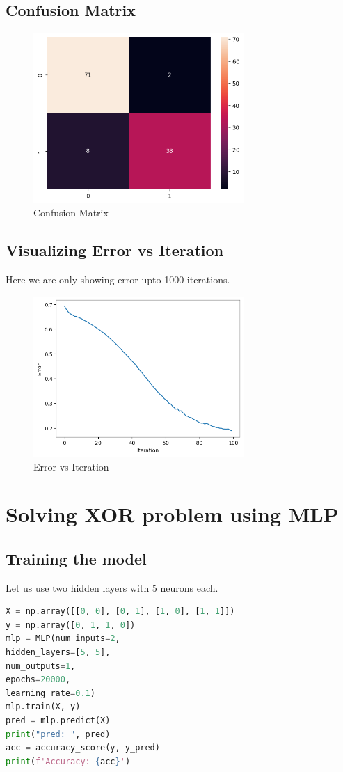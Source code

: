 \subsection{Confusion Matrix}
\begin{figure}[ht]
    \centering
    \includegraphics[width=8cm]{ch/figures/cm4.png}
    \caption{Confusion Matrix}
    \label{fig:loss}
\end{figure}
\newpage
\subsection{Visualizing Error vs Iteration}
Here we are only showing error upto 1000 iterations.
\begin{figure}[ht]
    \centering
    \includegraphics[width=8cm]{ch/figures/loss.png}
    \caption{Error vs Iteration}
    \label{fig:loss}
\end{figure}
\newpage
\section{Solving XOR problem using MLP}
\subsection{Training the model}
Let us use two hidden layers with 5 neurons each.
\begin{lstlisting}[language=Python]
X = np.array([[0, 0], [0, 1], [1, 0], [1, 1]])
y = np.array([0, 1, 1, 0])
mlp = MLP(num_inputs=2, 
hidden_layers=[5, 5], 
num_outputs=1, 
epochs=20000, 
learning_rate=0.1)
mlp.train(X, y)
pred = mlp.predict(X)
print("pred: ", pred)
acc = accuracy_score(y, y_pred)
print(f'Accuracy: {acc}')
\end{lstlisting}
